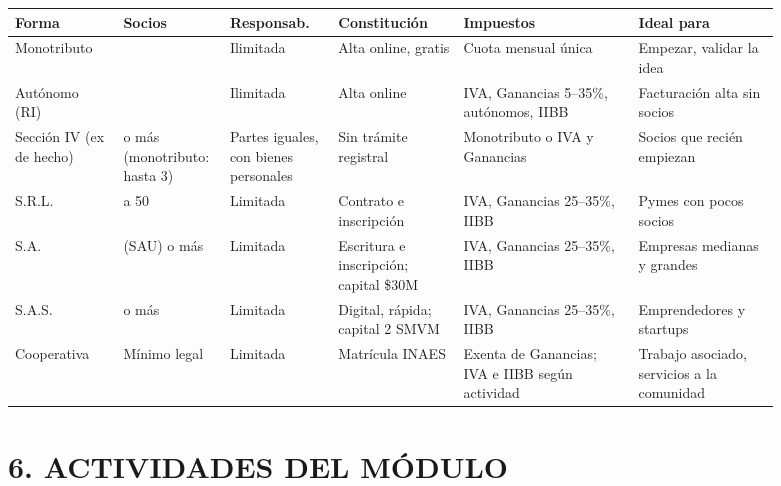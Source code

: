 \begin{center}
\footnotesize
\setlength{\tabcolsep}{3pt}
\begin{tabular}{|>{\raggedright\arraybackslash}p{0.13\linewidth}|>{\raggedright\arraybackslash}p{0.10\linewidth}|>{\raggedright\arraybackslash}p{0.13\linewidth}|>{\raggedright\arraybackslash}p{0.15\linewidth}|>{\raggedright\arraybackslash}p{0.21\linewidth}|>{\raggedright\arraybackslash}p{0.17\linewidth}|}
\hline
\textbf{Forma} & \textbf{Socios} & \textbf{Responsab.} & \textbf{Constitución} &
\textbf{Impuestos} & \textbf{Ideal para} \\ \hline
Monotributo & 1 & Ilimitada & Alta online, gratis & Cuota mensual única & Empezar,
validar la idea \\ \hline
Autónomo (RI) & 1 & Ilimitada & Alta online & IVA, Ganancias 5--35\%, autónomos, IIBB &
Facturación alta sin socios \\ \hline
Sección IV (ex de hecho) & 2 o más (monotributo: hasta 3) & Partes iguales, con bienes
personales & Sin trámite registral & Monotributo o IVA y Ganancias & Socios que recién
empiezan \\ \hline
S.R.L. & 2 a 50 & Limitada & Contrato e inscripción & IVA, Ganancias 25--35\%, IIBB & Pymes
con pocos socios \\ \hline
S.A. & 1 (SAU) o más & Limitada & Escritura e inscripción; capital \$30M & IVA, Ganancias
25--35\%, IIBB & Empresas medianas y grandes \\ \hline
S.A.S. & 1 o más & Limitada & Digital, rápida; capital 2 SMVM & IVA, Ganancias 25--35\%, IIBB
& Emprendedores y startups \\ \hline
Cooperativa & Mínimo legal & Limitada & Matrícula INAES & Exenta de Ganancias; IVA e IIBB
según actividad & Trabajo asociado, servicios a la comunidad \\ \hline
\end{tabular}
\end{center}

\section*{6. ACTIVIDADES DEL MÓDULO}

